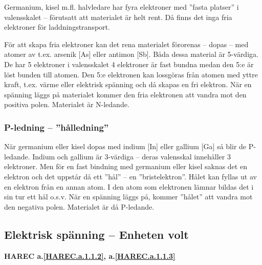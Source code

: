 Germanium, kisel m.fl. halvledare har fyra elektroner med ''fasta platser'' i
valensskalet -- förutsatt att materialet är helt rent.
Då finns det inga fria elektroner för laddningstransport.

För att skapa fria elektroner kan det rena materialet förorenas -- dopas -- med
atomer av t.ex. arsenik [As] eller antimon [Sb].
Båda dessa material är 5-värdiga.
De har 5 elektroner i valensskalet 4 elektroner är fast bundna medan
den 5:e är löst bunden till atomen.
Den 5:e elektronen kan lossgöras från atomen med yttre kraft, t.ex. värme eller
elektrisk spänning och då skapas en fri elektron.
När en spänning läggs på materialet kommer den fria elektronen att vandra mot
den positiva polen.
Materialet är N-ledande.

\subsubsection{P-ledning -- ''hålledning''}
När germanium eller kisel dopas med indium [In] eller gallium [Ga] så blir de
P-ledande.
Indium och gallium är 3-värdiga -- deras valensskal innehåller 3 elektroner.
Men för en fast bindning med germanium eller kisel saknas det en elektron och
det uppstår då ett ''hål'' -- en ''bristelektron''.
Hålet kan fyllas ut av en elektron från en annan atom.
I den atom som elektronen lämnar bildas det i sin tur ett hål o.s.v.
När en spänning läggs på, kommer ''hålet'' att vandra mot den negativa polen.
Materialet är då P-ledande.

\subsection{Elektrisk spänning -- Enheten volt}
\textbf{HAREC a.\ref{HAREC.a.1.1.2}\label{myHAREC.a.1.1.2b}, a.\ref{HAREC.a.1.1.3}\label{myHAREC.a.1.1.3b}}

